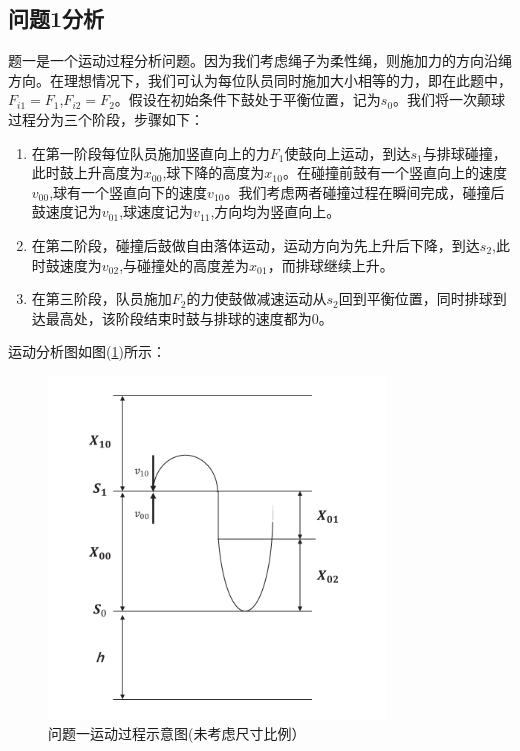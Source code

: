 \documentclass{cumcm}
\begin{document}
\subsection{问题1分析}
题一是一个运动过程分析问题。因为我们考虑绳子为柔性绳，则施加力的方向沿绳方向。在理想情况下，我们可认为每位队员同时施加大小相等的力，即在此题中，$F_{i1}=F_1$,$F_{i2}=F_2$。假设在初始条件下鼓处于平衡位置，记为$s_0$。我们将一次颠球过程分为三个阶段，步骤如下：
\begin{enumerate}
\item 在第一阶段每位队员施加竖直向上的力$F_1$使鼓向上运动，到达$s_1$与排球碰撞，此时鼓上升高度为$x_{00}$,球下降的高度为$x_{10}$。在碰撞前鼓有一个竖直向上的速度$v_{00}$,球有一个竖直向下的速度$v_{10}$。我们考虑两者碰撞过程在瞬间完成，碰撞后鼓速度记为$v_{01}$,球速度记为$v_{11}$,方向均为竖直向上。
\item 在第二阶段，碰撞后鼓做自由落体运动，运动方向为先上升后下降，到达$s_2$,此时鼓速度为$v_{02}$,与碰撞处的高度差为$x_{01}$，而排球继续上升。
\item 在第三阶段，队员施加$F_2$的力使鼓做减速运动从$s_2$回到平衡位置，同时排球到达最高处，该阶段结束时鼓与排球的速度都为$0$。
\end{enumerate}
运动分析图如图(\ref{fig-buoy})所示：
\begin{figure}[H]
\centering
\includegraphics[width=0.8\textwidth]{img/question1.pdf}
\caption{问题一运动过程示意图(未考虑尺寸比例）}\label{fig-buoy}
\end{figure}
\end{document}
